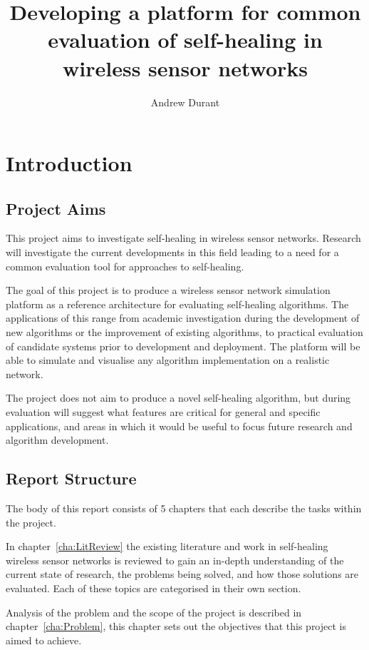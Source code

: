 \documentclass[authoryearcitations]{UoYCSproject}
\author{Andrew Durant}
\title{Developing a platform for common evaluation of self-healing in wireless sensor networks}
\begin{document}
\maketitle
\listoffigures
\listoftables
\renewcommand{\lstlistlistingname}{List of Listings}
\lstlistoflistings

\chapter{Introduction}
\label{cha:Introduction}

\section{Project Aims}

This project aims to investigate self-healing in wireless sensor networks. Research will investigate the current developments in this field leading to a need for a common evaluation tool for approaches to self-healing.

The goal of this project is to produce a wireless sensor network simulation platform as a reference architecture for evaluating self-healing algorithms. The applications of this range from academic investigation during the development of new algorithms or the improvement of existing algorithms, to practical evaluation of candidate systems prior to development and deployment. The platform will be able to simulate and visualise any algorithm implementation on a realistic network.

The project does not aim to produce a novel self-healing algorithm, but during evaluation will suggest what features are critical for general and specific applications, and areas in which it would be useful to focus future research and algorithm development.

\section{Report Structure}

The body of this report consists of 5 chapters that each describe the tasks within the project.

In chapter~\ref{cha:LitReview} the existing literature and work in self-healing wireless sensor networks is reviewed to gain an in-depth understanding of the current state of research, the problems being solved, and how those solutions are evaluated. Each of these topics are categorised in their own section.

Analysis of the problem and the scope of the project is described in chapter~\ref{cha:Problem}, this chapter sets out the objectives that this project is aimed to achieve.
\end{document}
